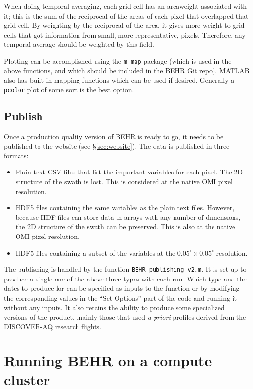 \documentclass[12pt]{article}
\begin{document}
	When doing temporal averaging, each grid cell has an areaweight associated with it; this is the sum of the reciprocal of the areas of each pixel that overlapped that grid cell. By weighting by the reciprocal of the area, it gives more weight to grid cells that got information from small, more representative, pixels.  Therefore, any temporal average should be weighted by this field.
	
	Plotting can be accomplished using the \lstinline$m_map$ package (which is used in the above functions, and which should be included in the BEHR Git repo). MATLAB also has built in mapping functions which can be used if desired. Generally a \lstinline$pcolor$ plot of some sort is the best option.
	
	\subsection{Publish}
	Once a production quality version of BEHR is ready to go, it needs to be published to the website (see \S\ref{sec:website}). The data is published in three formats:
	\begin{itemize}
	\item Plain text CSV files that list the important variables for each pixel. The 2D structure of the swath is lost. This is considered at the native OMI pixel resolution.
	\item HDF5 files containing the same variables as the plain text files. However, because HDF files can store data in arrays with any number of dimensions, the 2D structure of the swath can be preserved. This is also at the native OMI pixel resolution.
	\item HDF5 files containing a subset of the variables at the $0.05^\circ \times 0.05^\circ$ resolution.
	\end{itemize}
	
	The publishing is handled by the function \lstinline$BEHR_publishing_v2.m$. It is set up to produce a single one of the above three types with each run. Which type and the dates to produce for can be specified as inputs to the function or by modifying the corresponding values in the ``Set Options'' part of the code and running it without any inputs. It also retains the ability to produce some specialized versions of the product, mainly those that used \emph{a priori} profiles derived from the DISCOVER-AQ research flights.

\section{Running BEHR on a compute cluster} \label{sec:Cluster}
\end{document}
